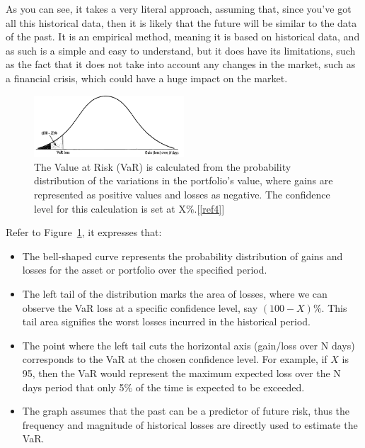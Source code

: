 \documentclass{article}
\begin{document}
As you can see, it takes a very literal approach, assuming that, since you've got all this historical data, then it is likely that the future will be similar to the data of the past. It is an empirical method, meaning it is based on historical data, and as such is a simple and easy to understand, but it does have its limitations, such as the fact that it does not take into account any changes in the market, such as a financial crisis, which could have a huge impact on the market.\\\vspace{0.3cm}

\begin{figure}[h]
  \centering
  \includegraphics[width=0.5\textwidth]{Images/Image 1.png}
  \caption{The Value at Risk (VaR) is calculated from the probability distribution of the variations in the portfolio's value, where gains are represented as positive values and losses as negative. The confidence level for this calculation is set at X\%.[\ref{ref4}]}
  \label{VaR Distribution Curve}
\end{figure}

Refer to Figure~\ref{VaR Distribution Curve}, it expresses that:  
\begin{itemize}
  \item The bell-shaped curve represents the probability distribution of gains and losses for the asset or portfolio over the specified period.
  
  \item The left tail of the distribution marks the area of losses, where we can observe the VaR loss at a specific confidence level, say \( (100 - X)\% \). This tail area signifies the worst losses incurred in the historical period.
  
  \item The point where the left tail cuts the horizontal axis (gain/loss over N days) corresponds to the VaR at the chosen confidence level. For example, if \( X \) is 95, then the VaR would represent the maximum expected loss over the N days period that only 5\% of the time is expected to be exceeded.
  
  \item The graph assumes that the past can be a predictor of future risk, thus the frequency and magnitude of historical losses are directly used to estimate the VaR.
\end{itemize}
\end{document}
